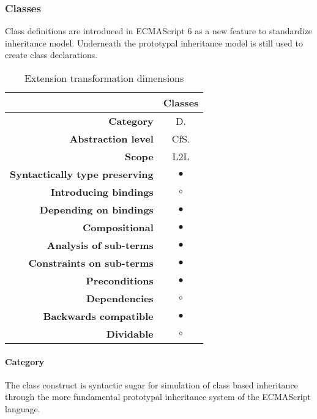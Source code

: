 \subsubsection{Classes}
Class definitions\cite[14.5]{SpecJS} are introduced in ECMAScript 6 as a new feature to standardize inheritance model. Underneath the prototypal inheritance model is still used to create class declarations.
\begin{table}[h]
\centering
\caption{Extension transformation dimensions}
\label{classes-table}
\begin{tabular}{@{}rc@{}}
\toprule
                                       & \multicolumn{1}{l}{\textbf{Classes}} \\ \midrule
\textbf{Category}                      & D.
\\ 
\textbf{Abstraction level}             & CfS.                          \\
\textbf{Scope}                         & L2L                               \\
\textbf{Syntactically type preserving} & $\bullet$                                          \\
\textbf{Introducing bindings}          & $\circ$                                          \\%
\textbf{Depending on bindings}         & $\bullet$                                           \\
\textbf{Compositional}                 & $\bullet$                                          \\
\textbf{Analysis of sub-terms}          & $\bullet$                                          \\
\textbf{Constraints on sub-terms}       & $\bullet$                                           \\
\textbf{Preconditions}                 & $\bullet$                                          \\
\textbf{Dependencies}                  & $\circ$                                           \\
\textbf{Backwards compatible}          & $\bullet$                                          \\
\textbf{Dividable}                     & $\circ$                                           \\ \bottomrule
\end{tabular}
\end{table}

\paragraph{Category}
The class construct is syntactic sugar for simulation of class based inheritance through the more fundamental prototypal inheritance system of the ECMAScript language.

